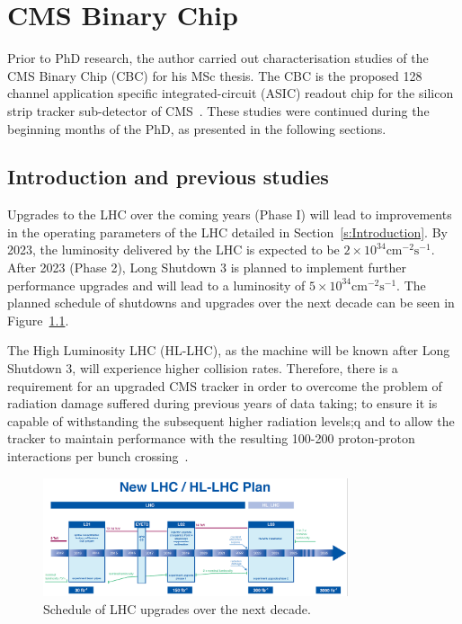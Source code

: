 \chapter{CMS Binary Chip}
\label{ac:cbc}

Prior to PhD research, the author carried out characterisation studies of the CMS Binary Chip (CBC) for his
MSc thesis. The CBC is the proposed 128 channel application specific integrated-circuit (ASIC) readout chip
for the silicon strip tracker sub-detector of CMS~\cite{JacobJA}. These studies were continued during the
beginning months of the PhD, as presented in the following sections.

\section{Introduction and previous studies}
\label{s:introduction_and_previous_studies}

Upgrades to the LHC over the coming years (Phase I) will lead to improvements in the operating parameters of
the LHC detailed in Section~\ref{s:Introduction}. By 2023, the luminosity delivered by the LHC is expected to
be $2\times10^{34}\mathrm{cm^{-2}s^{-1}}$. After 2023 (Phase 2), Long Shutdown 3 is planned to implement
further performance upgrades and will lead to a luminosity of $5\times10^{34}\mathrm{cm^{-2}s^{-1}}$.
The planned schedule of shutdowns and upgrades over the next decade can be seen
in Figure~\ref{fig:lhc_upgrades}.

The High Luminosity LHC (HL-LHC), as the machine will be known after Long Shutdown 3, will experience higher
collision rates. Therefore, there is a requirement for an upgraded CMS tracker in order to overcome the
problem of radiation damage suffered during previous years of data taking; to ensure it is capable of
withstanding the subsequent higher radiation levels;q and to allow the tracker to maintain performance with
the resulting 100-200 proton-proton interactions per bunch crossing~\cite{Mersi:2011jv}.

\begin{figure}[ht] %
   \centering
     \includegraphics[width=0.8\textwidth]{Chapters/07_Appendices/07c_2_Images/newlhcplan}\hfill
     \caption{Schedule of LHC upgrades over the next decade.}
     \label{fig:lhc_upgrades}
\end{figure}

